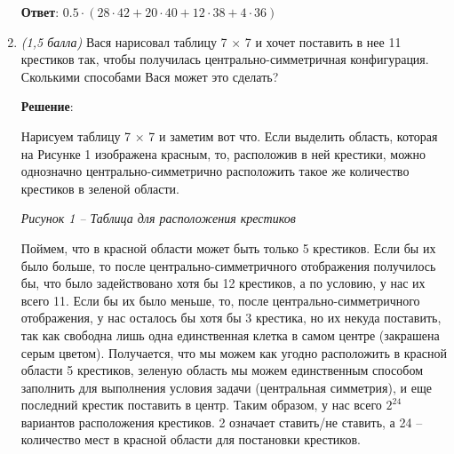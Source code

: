\documentclass{article}
\begin{document}
\begin{enumerate}
        \textbf{Ответ}:
        $0.5\cdot(28\cdot42+20\cdot40+12\cdot38+4\cdot36)$

        \item \textit{(1,5 балла)} Вася нарисовал таблицу 7 × 7 и хочет поставить в нее 11 крестиков так, чтобы получилась центрально-симметричная конфигурация. Сколькими способами Вася может это сделать?
        
        \textbf{Решение}:

        Нарисуем таблицу 7 × 7 и заметим вот что. Если выделить область, которая на Рисунке 1 изображена красным, то, расположив в ней крестики, можно однозначно центрально-симметрично расположить такое же количество крестиков в зеленой области.
        \begin{center}
    
            \textit{Рисунок 1 -- Таблица для расположения крестиков}
        \end{center}
        Поймем, что в красной области может быть только 5 крестиков. Если бы их было больше, то после центрально-симметричного отображения получилось бы, что было задействовано хотя бы 12 крестиков, а по условию, у нас их всего 11. Если бы их было меньше, то, после центрально-симметричного отображения, у нас осталось бы хотя бы 3 крестика, но их некуда поставить, так как свободна лишь одна единственная клетка в самом центре (закрашена серым цветом). Получается, что мы можем как угодно расположить в красной области 5 крестиков, зеленую область мы можем единственным способом заполнить для выполнения условия задачи (центральная симметрия), и еще последний крестик поставить в центр. Таким образом, у нас всего $2^{24}$ вариантов расположения крестиков. 2 означает ставить/не ставить, а 24 -- количество мест в красной области для постановки крестиков.


\end{enumerate}
\end{document}
